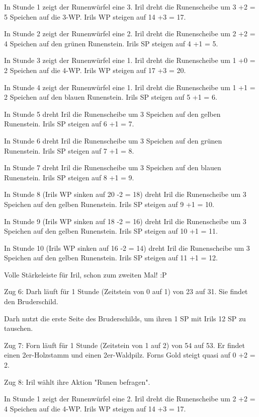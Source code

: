 \documentclass[10pt, a4paper, oneside]{book}
\begin{document}
{In Stunde 1 zeigt der Runenwürfel eine 3. Iril dreht die Runenscheibe um 3 +2 = 5 Speichen auf die 3-WP. Irils WP steigen auf 14 +3 = 17.

In Stunde 2 zeigt der Runenwürfel eine 2. Iril dreht die Runenscheibe um 2 +2 = 4 Speichen auf den grünen Runenstein. Irils SP steigen auf 4 +1 = 5.

In Stunde 3 zeigt der Runenwürfel eine 1. Iril dreht die Runenscheibe um 1 +0 = 2 Speichen auf die 4-WP. Irils WP steigen auf 17 +3 = 20.

In Stunde 4 zeigt der Runenwürfel eine 1. Iril dreht die Runenscheibe um 1 +1 = 2 Speichen auf den blauen Runenstein. Irils SP steigen auf 5 +1 = 6.

In Stunde 5 dreht Iril die Runenscheibe um 3 Speichen auf den gelben Runenstein. Irils SP steigen auf 6 +1 = 7.

In Stunde 6 dreht Iril die Runenscheibe um 3 Speichen auf den grünen Runenstein. Irils SP steigen auf 7 +1 = 8.

In Stunde 7 dreht Iril die Runenscheibe um 3 Speichen auf den blauen Runenstein. Irils SP steigen auf 8 +1 = 9.

In Stunde 8 (Irils WP sinken auf 20 -2 = 18) dreht Iril die Runenscheibe um 3 Speichen auf den gelben Runenstein. Irils SP steigen auf 9 +1 = 10.

In Stunde 9 (Irils WP sinken auf 18 -2 = 16) dreht Iril die Runenscheibe um 3 Speichen auf den gelben Runenstein. Irils SP steigen auf 10 +1 = 11.

In Stunde 10 (Irils WP sinken auf 16 -2 = 14) dreht Iril die Runenscheibe um 3 Speichen auf den gelben Runenstein. Irils SP steigen auf 11 +1 = 12.

Volle Stärkeleiste für Iril, schon zum zweiten Mal! :P



Zug 6: Darh läuft für 1 Stunde (Zeitstein von 0 auf 1) von 23 auf 31. Sie findet den Bruderschild.

Darh nutzt die erste Seite des Bruderschilds, um ihren 1 SP mit Irils 12 SP zu tauschen.



Zug 7: Forn läuft für 1 Stunde (Zeitstein von 1 auf 2) von 54 auf 53. Er findet einen 2er-Holzstamm und einen 2er-Waldpilz. Forns Gold steigt quasi auf 0 +2 = 2.



Zug 8: Iril wählt ihre Aktion "Runen befragen".

In Stunde 1 zeigt der Runenwürfel eine 2. Iril dreht die Runenscheibe um 2 +2 = 4 Speichen auf die 4-WP. Irils WP steigen auf 14 +3 = 17.

}
\end{document}
